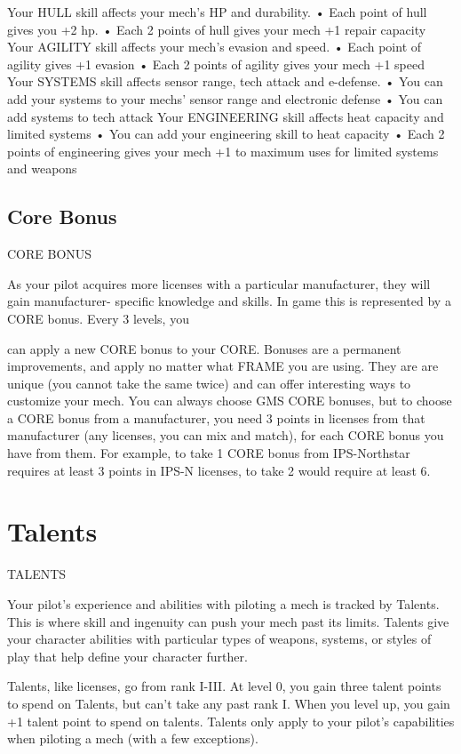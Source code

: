 Your HULL skill affects your mech’s HP and durability.
       •  Each point of hull gives you +2 hp.
       •  Each 2 points of hull gives your mech +1 repair capacity
Your AGILITY skill affects your mech’s evasion and speed.
       •  Each point of agility gives +1 evasion
       •  Each 2 points of agility gives your mech +1 speed
Your SYSTEMS skill affects sensor range, tech attack and e-defense.
       •  You can add your systems to your mechs’ sensor range and electronic defense
       •  You can add systems to tech attack
Your ENGINEERING skill affects heat capacity and limited systems
       •  You can add your engineering skill to heat capacity
       •  Each 2 points of engineering gives your mech +1 to maximum uses for limited systems
         and weapons
\subsection{Core Bonus}
                                              CORE BONUS

As your pilot acquires more licenses with a particular manufacturer, they will gain manufacturer-
specific knowledge and skills. In game this is represented by a CORE bonus. Every 3 levels, you




can apply a new CORE bonus to your CORE. Bonuses are a permanent improvements, and
apply no matter what FRAME you are using. They are are unique (you cannot take the same
twice) and can offer interesting ways to customize your mech. You can always choose GMS
CORE bonuses, but to choose a CORE bonus from a manufacturer, you need 3 points in licenses
from that manufacturer (any licenses, you can mix and match), for each CORE bonus you have
from them. For example, to take 1 CORE bonus from IPS-Northstar requires at least 3 points in
IPS-N licenses, to take 2 would require at least 6.

\section{Talents}
                                                 TALENTS

Your pilot’s experience and abilities with piloting a mech is tracked by Talents. This is where skill
and ingenuity can push your mech past its limits. Talents give your character abilities with
particular types of weapons, systems, or styles of play that help define your character further.


Talents, like licenses, go from rank I-III. At level 0, you gain three talent points to spend on
Talents, but can’t take any past rank I. When you level up, you gain +1 talent point to spend on
talents. Talents only apply to your pilot’s capabilities when piloting a mech (with a few
exceptions).


